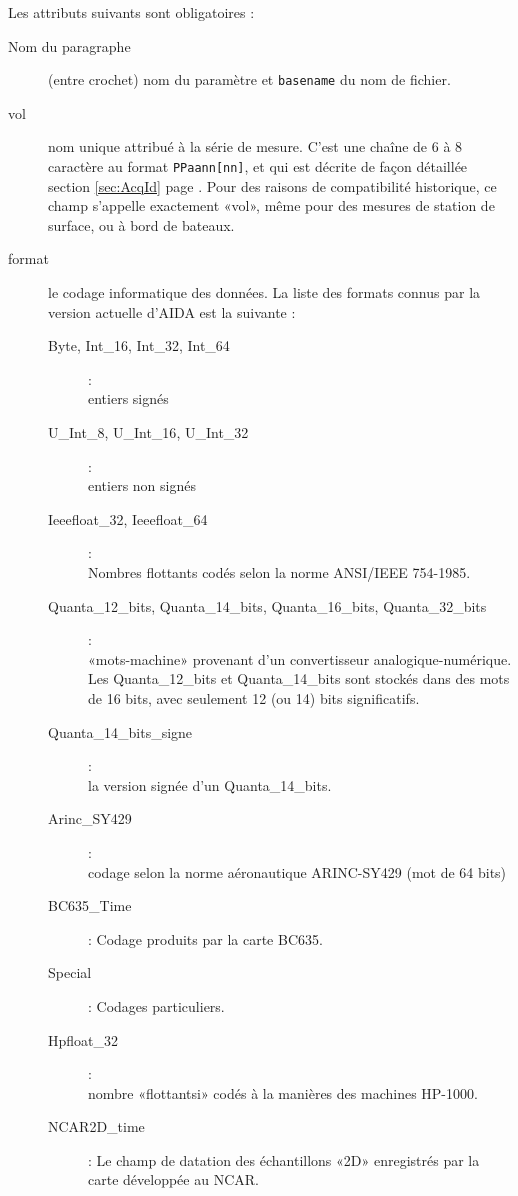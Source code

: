 Les attributs suivants sont obligatoires :

\begin{description}
  \item[Nom du paragraphe] (entre crochet) nom du paramètre
et \texttt{basename} du nom de fichier.
  \item[vol] nom unique attribué à la série de mesure. C'est une chaîne de
6 à 8 caractère au format \texttt{PPaann[nn]}, et qui est décrite de façon
détaillée section \ref{sec:AcqId} page \pageref{sec:AcqId}. Pour des raisons
de compatibilité historique, ce champ s'appelle exactement «vol», même pour des
mesures de station de surface, ou à bord de bateaux.
  \item[format] le codage informatique des données. La liste des
  formats connus par la version actuelle d'AIDA est la suivante :

  \begin{description}
    \item[\textsf{Byte}, \textsf{Int\_16}, \textsf{Int\_32}, \textsf{Int\_64}] :\\
       entiers signés
    \item[\textsf{U\_Int\_8}, \textsf{U\_Int\_16}, \textsf{U\_Int\_32}] : \\
       entiers non signés
    \item[\textsf{Ieeefloat\_32}, \textsf{Ieeefloat\_64}] : \\
       Nombres \og flottants\fg{} codés selon la norme ANSI/IEEE 754-1985.
    \item[\textsf{Quanta\_12\_bits},
          \textsf{Quanta\_14\_bits},
          \textsf{Quanta\_16\_bits},
          \textsf{Quanta\_32\_bits}] : \\
       «mots-machine» provenant d'un convertisseur analogique-numérique. \\
       Les \textsf{Quanta\_12\_bits} et \textsf{Quanta\_14\_bits} sont
       stockés dans des mots de 16 bits, avec seulement 12 (ou 14) bits
       significatifs.
    \item[\textsf{Quanta\_14\_bits\_signe}] : \\
       la version signée d'un \textsf{Quanta\_14\_bits}.
    \item[\textsf{Arinc\_SY429}] : \\
       codage selon la norme aéronautique ARINC-SY429 (mot de 64 bits)
    \item[\textsf{BC635\_Time}] : Codage produits par la carte BC635.
    \item[\textsf{Special}] : Codages particuliers.
    \item[\textsf{Hpfloat\_32}] : \\
       nombre «flottantsi» codés à la manières des machines HP-1000.
    \item[\textsf{NCAR2D\_time}] : Le champ de datation des échantillons 
«2D» enregistrés par la carte développée au NCAR.
  \end{description}


\end{description}

